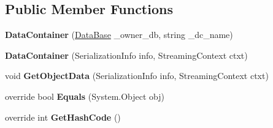 \subsection*{Public Member Functions}
\begin{DoxyCompactItemize}
\item 
\hypertarget{class_dwarf_d_b_1_1_data_structures_1_1_data_container_aaef12033ab5b4b00fde86e41f4bfece2}{
{\bfseries DataContainer} (\hyperlink{class_dwarf_d_b_1_1_data_structures_1_1_data_base}{DataBase} \_\-owner\_\-db, string \_\-dc\_\-name)}
\label{class_dwarf_d_b_1_1_data_structures_1_1_data_container_aaef12033ab5b4b00fde86e41f4bfece2}

\item 
\hypertarget{class_dwarf_d_b_1_1_data_structures_1_1_data_container_aedc4383268fbcc1f26b90e013cb9480a}{
{\bfseries DataContainer} (SerializationInfo info, StreamingContext ctxt)}
\label{class_dwarf_d_b_1_1_data_structures_1_1_data_container_aedc4383268fbcc1f26b90e013cb9480a}

\item 
\hypertarget{class_dwarf_d_b_1_1_data_structures_1_1_data_container_a2b870066d9ec71502d57a034c8beb610}{
void {\bfseries GetObjectData} (SerializationInfo info, StreamingContext ctxt)}
\label{class_dwarf_d_b_1_1_data_structures_1_1_data_container_a2b870066d9ec71502d57a034c8beb610}

\item 
\hypertarget{class_dwarf_d_b_1_1_data_structures_1_1_data_container_a6cb4a4c31f7e46f814632fc161024ac1}{
override bool {\bfseries Equals} (System.Object obj)}
\label{class_dwarf_d_b_1_1_data_structures_1_1_data_container_a6cb4a4c31f7e46f814632fc161024ac1}

\item 
\hypertarget{class_dwarf_d_b_1_1_data_structures_1_1_data_container_a5f7fad1592467a438632e9351ec124fa}{
override int {\bfseries GetHashCode} ()}
\label{class_dwarf_d_b_1_1_data_structures_1_1_data_container_a5f7fad1592467a438632e9351ec124fa}


\end{DoxyCompactItemize}
